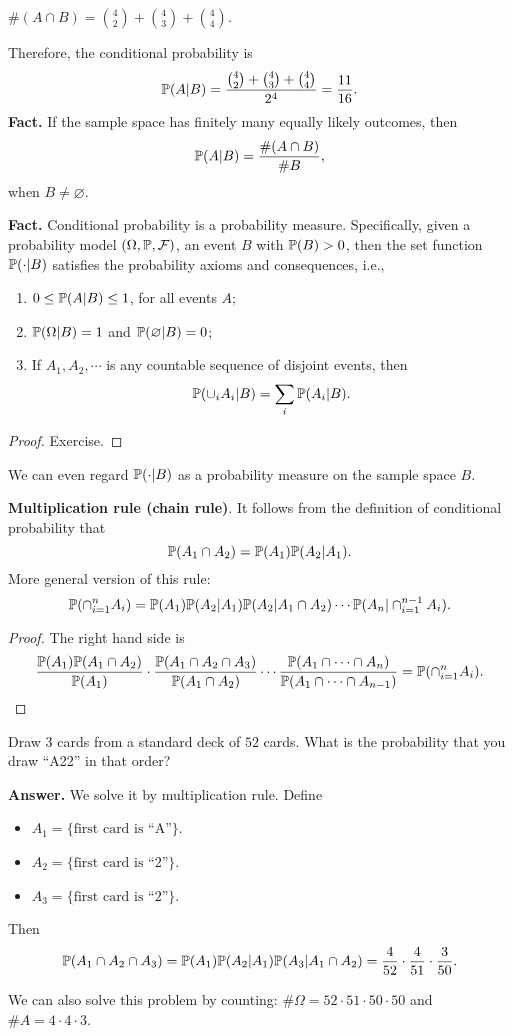 $\# (A\cap B) = \binom{4}{2} + \binom{4}{3} + \binom{4}{4}$.

Therefore, the conditional probability is
\[
  \mathbb{P}(A| B) = \frac{\binom{4}{2} + \binom{4}{3} + \binom{4}{4}}{2^4} = \frac{11}{16}.
\]
\textbf{Fact.} If the sample space has finitely many equally likely outcomes,
then
\[
  \mathbb{P}(A| B) = \frac{\# (A\cap B)}{\# B},
\]
when $B\neq \varnothing$.

\textbf{Fact.} Conditional probability is a probability measure. Specifically,
given a probability model $(\Omega, \mathbb{P}, \mathcal{F})$, an event $B$ with $\mathbb{P}(B)>0$,
then the set function $\mathbb{P}(\cdot| B)$ satisfies the probability axioms and
consequences, i.e.,
\begin{enumerate}[(1)]
\item $0\le \mathbb{P}(A| B) \le 1$, for all events $A$;
\item $\mathbb{P}(\Omega| B) = 1$ and $\mathbb{P}(\varnothing| B) = 0$;
\item If $A_1,A_2,\cdots$ is any countable sequence of disjoint events, then
  \[
    \mathbb{P}(\cup_iA_i | B) = \sum_i\mathbb{P}(A_i| B).
  \]
 \end{enumerate}
  \begin{proof}
    Exercise.
  \end{proof}
  \begin{remark}
    We can even regard $\mathbb{P}(\cdot| B)$ as a probability measure on the sample
    space $B$.
  \end{remark}

  \textbf{Multiplication rule (chain rule)}. It follows from the definition of
  conditional probability that
  \[
    \mathbb{P}(A_1\cap A_2) = \mathbb{P}(A_1) \mathbb{P}(A_2| A_1).
  \]
  More general version of this rule:
  \[
    \mathbb{P}(\cap_{i=1}^n A_i) = \mathbb{P}(A_1)\mathbb{P}(A_2| A_1) \mathbb{P}(A_2| A_1\cap A_2)
    \cdots \mathbb{P}(A_n| \cap_{i=1}^{n-1} A_i).
  \]
\begin{proof}
  The right hand side is
  \[
    \frac{\mathbb{P}(A_1)\mathbb{P}(A_1\cap A_2)}{\mathbb{P}(A_1)}\cdot \frac{\mathbb{P}(A_1\cap A_2\cap
      A_3)}{\mathbb{P}(A_1\cap A_2)}\cdots \frac{\mathbb{P}(A_1\cap\cdots\cap
      A_n)}{\mathbb{P}(A_1\cap\cdots\cap A_{n-1})} = \mathbb{P}(\cap_{i=1}^n A_i).
  \]
\end{proof}
\begin{example}
  Draw $3$ cards from a standard deck of $52$ cards. What is the probability
  that you draw ``A22'' in that order?
\end{example}
\textbf{Answer.} We solve it by multiplication rule. Define
\begin{itemize}
\item $A_1 = \{\text{first card is ``A''}\}$.
\item $A_2 = \{\text{first card is ``2''}\}$.
\item $A_3 = \{\text{first card is ``2''}\}$.
\end{itemize}
Then
\[
  \mathbb{P}(A_1\cap A_2\cap A_3) = \mathbb{P}(A_1)\mathbb{P}(A_2|A_1)\mathbb{P}(A_3| A_1\cap
  A_2)=\frac{4}{52}\cdot \frac{4}{51}\cdot \frac{3}{50}.
\]
\begin{remark}
  We can also solve this problem by counting: $\#\Omega = 52\cdot 51\cdot
  50\cdot 50$ and $\# A = 4\cdot 4\cdot 3$. 
\end{remark}

